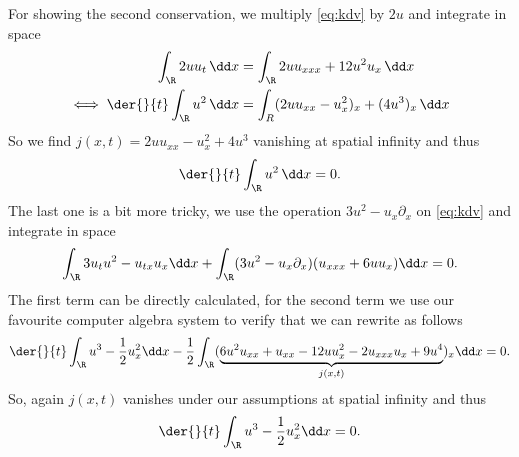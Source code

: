 For showing the second conservation, we multiply \cref{eq:kdv} by $2u$ and integrate in space
\begin{align}
\int_\R2 uu_t\,\dd x & = \int_\R 2uu_{xxx} +12u^2u_x \, \dd x\\
\iff\der{}{t}\int_\R u^2\, \dd x&= \int_R (2uu_{xx}-u_x^2)_x + (4u^3)_x\,\dd x
\end{align}
So we find $j(x,t)=2uu_{xx}-u_x^2 + 4u^3$ vanishing at spatial infinity and thus 
\begin{align}
\der{}{t}\int_\R u^2\, \dd x= 0.
\end{align}
The last one is a bit more tricky, we use the operation $3u^2-u_x\partial_x$ on \cref{eq:kdv} and integrate in space 
\begin{align}
\int_\R3u_t u^2 - u_{tx}u_x\dd x +\int_\R(3u^2-u_x\partial_x)(u_{xxx} +6uu_x)\dd x =0.
\end{align}
The first term can be directly calculated, for the second term we use our favourite computer algebra system to verify that we can rewrite as follows
\begin{align}
\der{}{t}\int_\R u^3 -\frac 12 u_x^2 \dd x -\frac 12\int_\R(\underbrace{6u^2u_{xx}+u_{xx}-12uu_x^2-2u_{xxx}u_x+9u^4}_{j(x,t)})_x\dd x = 0.
\end{align}
So, again $j(x,t)$ vanishes under our assumptions at spatial infinity and thus
\begin{align}
\der{}{t}\int_\R u^3 -\frac 12 u_x^2 \dd x  = 0.
\end{align}
